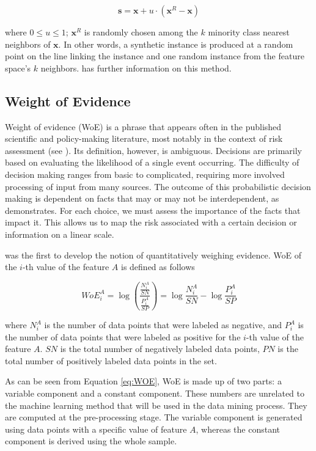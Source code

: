 \begin{equation}
\label{eq:SMOTE}
\mathbf{s} = \mathbf{x} + u \cdot (\mathbf{x}^R - \mathbf{x})
\end{equation}

where \(0 \le u \le 1\); \(\mathbf{x}^R\) is randomly chosen among the
\(k\) minority class nearest neighbors of \(\mathbf{x}\). In other
words, a synthetic instance is produced at a random point on the line
linking the instance and one random instance from the feature space's
\(k\) neighbors. \citet{Chawla2002} has further information on this
method.

\hypertarget{weight-of-evidence}{%
\subsection{Weight of Evidence}\label{weight-of-evidence}}

Weight of evidence (WoE) is a phrase that appears often in the published
scientific and policy-making literature, most notably in the context of
risk assessment (see \citet{Weed2005}). Its definition, however, is
ambiguous. Decisions are primarily based on evaluating the likelihood of
a single event occurring. The difficulty of decision making ranges from
basic to complicated, requiring more involved processing of input from
many sources. The outcome of this probabilistic decision making is
dependent on facts that may or may not be interdependent, as
\citet{Chater2008} demonstrates. For each choice, we must assess the
importance of the facts that impact it. This allows us to map the risk
associated with a certain decision or information on a linear scale.

\citet{Good1950} was the first to develop the notion of quantitatively
weighing evidence. WoE of the \(i\)-th value of the feature \(A\) is
defined as follows

\begin{equation}
\label{eq:WOE}
WoE_i^A =\log\left( \frac{\frac{N_i^A}{SN}}{\frac{P_i^A}{SP}} \right) = \log\frac{N_i^A}{SN} - \log \frac{P_i^A}{SP} 
\end{equation}

where \(N_i^A\) is the number of data points that were labeled as
negative, and \(P_i^A\) is the number of data points that were labeled
as positive for the \(i\)-th value of the feature \(A\). \(SN\) is the
total number of negatively labeled data points, \(PN\) is the total
number of positively labeled data points in the set.

As can be seen from Equation \ref{eq:WOE}, WoE is made up of two parts:
a variable component and a constant component. These numbers are
unrelated to the machine learning method that will be used in the data
mining process. They are computed at the pre-processing stage. The
variable component is generated using data points with a specific value
of feature \(A\), whereas the constant component is derived using the
whole sample.

